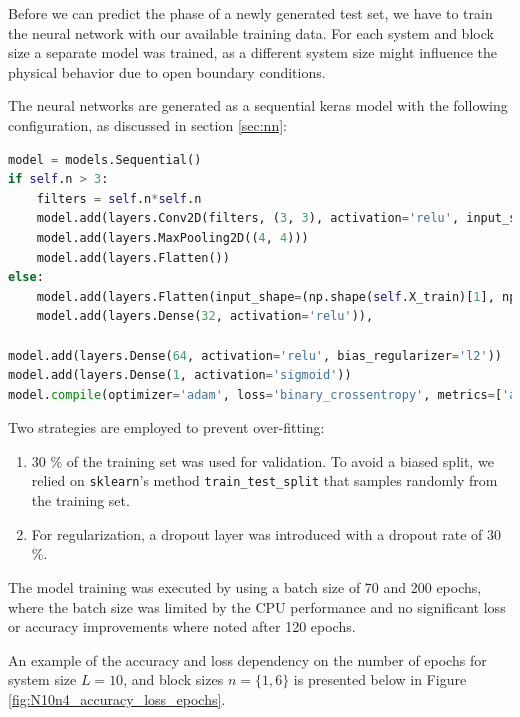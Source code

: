 \documentclass[reprint,amsmath,amssymb,aps,prb]{revtex4-2}
\begin{document}
Before we can predict the phase of a newly generated test set, we have to train the neural network with our available training data. For each system and block size a separate model was trained, as a different system size might influence the physical behavior due to open boundary conditions.

The neural networks are generated as a sequential keras model with the following configuration, as discussed in section \ref{sec:nn}: 
\begin{lstlisting}[language=Python]
model = models.Sequential()
if self.n > 3:
	filters = self.n*self.n
	model.add(layers.Conv2D(filters, (3, 3), activation='relu', input_shape=(np.shape(self.X_train[0])[0], np.shape(self.X_train[0])[1], 2)))
	model.add(layers.MaxPooling2D((4, 4)))
	model.add(layers.Flatten())
else:
	model.add(layers.Flatten(input_shape=(np.shape(self.X_train)[1], np.shape(self.X_train)[1], 2)))
	model.add(layers.Dense(32, activation='relu')),

model.add(layers.Dense(64, activation='relu', bias_regularizer='l2'))
model.add(layers.Dense(1, activation='sigmoid'))
model.compile(optimizer='adam', loss='binary_crossentropy', metrics=['accuracy'])
\end{lstlisting}

Two strategies are employed to prevent over-fitting:
\begin{enumerate}
	\item $30$ \% of the training set was used for validation. To avoid a biased split, we relied on \texttt{sklearn}'s method \texttt{train\_test\_split} that samples randomly from the training set.
	\item For regularization, a dropout layer was introduced with a dropout rate of $30$ \%.
\end{enumerate}

The model training was executed by using a batch size of 70 and 200 epochs, where the batch size was limited by the CPU performance and no significant loss or accuracy improvements where noted after 120 epochs.%

An example of the accuracy and loss dependency on the number of epochs for system size $L=10$, and block sizes $n=\{1, 6\}$ is presented below in Figure \ref{fig:N10n4_accuracy_loss_epochs}.
\end{document}

